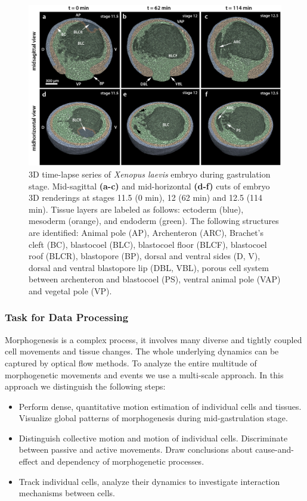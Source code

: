 \begin{figure}[ht]
  \centerline{
    \includegraphics[scale = 0.22]{figures/app_embryo_renderings.PNG} 
  }  
  \caption{3D time-lapse series of \textit{Xenopus laevis} embryo during gastrulation stage. Mid-sagittal \textbf{(a-c)} and mid-horizontal \textbf{(d-f)} cuts of embryo 3D renderings
at stages 11.5 (0 min), 12 (62 min) and 12.5 (114 min). Tissue layers are labeled as follows:  ectoderm (blue),
mesoderm (orange), and endoderm (green). The following structures are identified:  Animal pole (AP), Archenteron (ARC),
Brachet’s cleft (BC), blastocoel (BLC), blastocoel floor (BLCF), blastocoel roof
(BLCR), blastopore (BP), dorsal and ventral sides (D, V), dorsal and ventral
blastopore lip (DBL, VBL), porous cell system between archenteron and
blastocoel (PS), ventral animal pole (VAP) and vegetal pole (VP).}
  \label{fig:app_embryo_renderings}
\end{figure}



\subsubsection{Task for Data Processing}

Morphogenesis is a complex process, it involves many diverse and tightly coupled cell movements and tissue changes. The whole underlying dynamics can be captured by optical flow methods. To analyze the entire multitude of morphogenetic movements and events we use a multi-scale approach. In this approach we distinguish the following steps:
\begin{itemize}
	\item Perform dense, quantitative motion estimation of individual cells and tissues. Visualize global patterns of morphogenesis during mid-gastrulation stage.
	
	\item Distinguish collective motion and motion of individual cells. Discriminate between passive and active movements. Draw conclusions about cause-and-effect and dependency of morphogenetic processes.
	
	\item Track individual cells, analyze their dynamics to investigate interaction mechanisms between cells.
	
\end{itemize}


